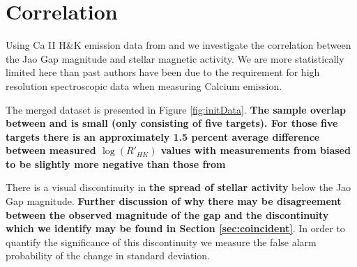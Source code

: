 \section{Correlation}\label{sec:results}
Using Ca II H\&K emission data from \citet{Perdelwitz2021} and
\citet{Boudreaux2022} \citep[quantified using the $R'_{HK}$
metric][]{Middelkoop1982, Rutten1984} we investigate the correlation between
the Jao Gap magnitude and stellar magnetic activity. We are more statistically
limited here than past authors have been due to the requirement for high
resolution spectroscopic data when measuring Calcium emission.

The merged dataset is presented in Figure \ref{fig:initData}. \textbf{The
sample overlap between \citet{Perdelwitz2021} and \citet{Boudreaux2022} is
small (only consisting of five targets). For those five targets there is an
approximately 1.5 percent average difference between measured $\log(R'_{HK})$
values with measurements from \citeauthor{Boudreaux2022} biased to be slightly
more negative than those from \citeauthor{Perdelwitz2021}}

There is a visual discontinuity in \textbf{the spread of stellar activity}
below the Jao Gap magnitude. \textbf{Further discussion of why there may be
disagreement between the observed magnitude of the gap and the discontinuity
which we identify may be found in Section \ref{sec:coincident}}. In order to
quantify the significance of this discontinuity we measure the false alarm
probability of the change in standard deviation.

